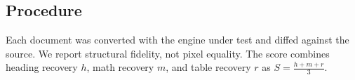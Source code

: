 \subsection{Procedure}
Each document was converted with the engine under test and diffed against
the source. We report structural fidelity, not pixel equality. The score
combines heading recovery $h$, math recovery $m$, and table recovery $r$ as
$S = \frac{h + m + r}{3}$.
